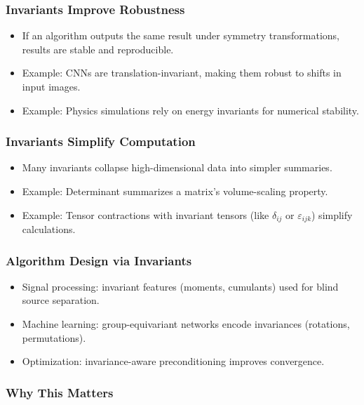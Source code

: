 \documentclass[
  letterpaper,
  DIV=11,
  numbers=noendperiod]{scrreprt}
\providecommand{\tightlist}{%
  \setlength{\itemsep}{0pt}\setlength{\parskip}{0pt}}
\begin{document}
\subsubsection{Invariants Improve
Robustness}\label{invariants-improve-robustness}

\begin{itemize}
\tightlist
\item
  If an algorithm outputs the same result under symmetry
  transformations, results are stable and reproducible.
\item
  Example: CNNs are translation-invariant, making them robust to shifts
  in input images.
\item
  Example: Physics simulations rely on energy invariants for numerical
  stability.
\end{itemize}

\subsubsection{Invariants Simplify
Computation}\label{invariants-simplify-computation}

\begin{itemize}
\tightlist
\item
  Many invariants collapse high-dimensional data into simpler summaries.
\item
  Example: Determinant summarizes a matrix's volume-scaling property.
\item
  Example: Tensor contractions with invariant tensors (like
  \(\delta_{ij}\) or \(\varepsilon_{ijk}\)) simplify calculations.
\end{itemize}

\subsubsection{Algorithm Design via
Invariants}\label{algorithm-design-via-invariants}

\begin{itemize}
\tightlist
\item
  Signal processing: invariant features (moments, cumulants) used for
  blind source separation.
\item
  Machine learning: group-equivariant networks encode invariances
  (rotations, permutations).
\item
  Optimization: invariance-aware preconditioning improves convergence.
\end{itemize}

\subsubsection{Why This Matters}\label{why-this-matters-59}
\end{document}
